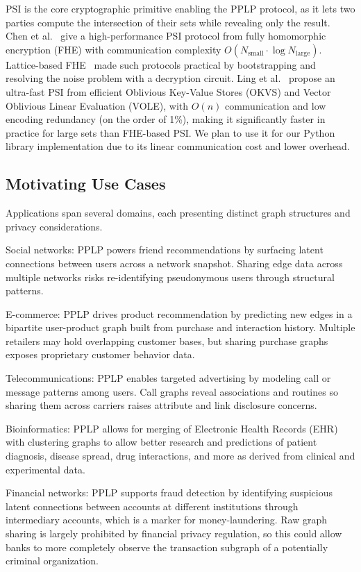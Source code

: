 \documentclass[sigconf]{acmart}
\begin{document}
PSI is the core cryptographic primitive enabling the PPLP protocol, as it lets two parties compute the intersection of their sets while revealing only the result. Chen et al.~\cite{chen2017fast} give a high-performance PSI protocol from fully homomorphic encryption (FHE) with communication complexity $O(N_{\text{small}} \cdot \log N_{\text{large}})$. Lattice-based FHE~\cite{gentry2009lattice} made such protocols practical by bootstrapping and resolving the noise problem with a decryption circuit. Ling et al.~\cite{ling2025ultrafast} propose an ultra-fast PSI from efficient Oblivious Key-Value Stores (OKVS) and Vector Oblivious Linear Evaluation (VOLE), with $O(n)$ communication and low encoding redundancy (on the order of 1\%), making it significantly faster in practice for large sets than FHE-based PSI. We plan to use it for our Python library implementation due to its linear communication cost and lower overhead.

\subsection{Motivating Use Cases}
Applications span several domains, each presenting distinct graph structures and privacy considerations.

Social networks: PPLP powers friend recommendations by surfacing latent connections between users across a network snapshot. Sharing edge data across multiple networks risks re-identifying pseudonymous users through structural patterns.

E-commerce: PPLP drives product recommendation by predicting new edges in a bipartite user-product graph built from purchase and interaction history. Multiple retailers may hold overlapping customer bases, but sharing purchase graphs exposes proprietary customer behavior data.

Telecommunications: PPLP enables targeted advertising by modeling call or message patterns among users. Call graphs reveal associations and routines so sharing them across carriers raises attribute and link disclosure concerns.

Bioinformatics: PPLP allows for merging of Electronic Health Records (EHR) with clustering graphs to allow better research and predictions of patient diagnosis, disease spread, drug interactions, and more as derived from clinical and experimental data.

Financial networks: PPLP supports fraud detection by identifying suspicious latent connections between accounts at different institutions through intermediary accounts, which is a marker for money-laundering. Raw graph sharing is largely prohibited by financial privacy regulation, so this could allow banks to more completely observe the transaction subgraph of a potentially criminal organization.
\end{document}
